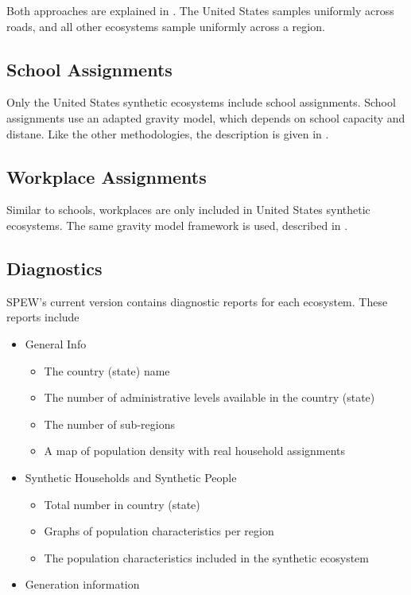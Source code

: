\documentclass{article}
\begin{document}
Both approaches are explained in \cite{spew}. The United States samples uniformly across roads, and all other ecosystems sample uniformly across a region.

\subsection{School Assignments}
Only the United States synthetic ecosystems include school assignments. School assignments use an adapted gravity model, which depends on school capacity and distane. Like the other methodologies, the description is given in \cite{spew}. 

\subsection{Workplace Assignments}
Similar to schools, workplaces are only included in United States synthetic ecosystems. The same gravity model framework is used, described in \cite{spew}. 

\subsection{Diagnostics}
SPEW's current version contains diagnostic reports for each ecosystem. These reports include

\begin{itemize}
  \item General Info
    \begin{itemize}
    \item The country (state) name 
    \item The number of administrative levels available in the country (state)
    \item The number of sub-regions
    \item A map of population density with real household assignments
    \end{itemize}
  \item Synthetic Households and Synthetic People
    \begin{itemize}
  \item Total number in country (state)
  \item Graphs of population characteristics per region
  \item The population characteristics included in the synthetic ecosystem
    \end{itemize}
  \item Generation information
\end{itemize}
\end{document}
